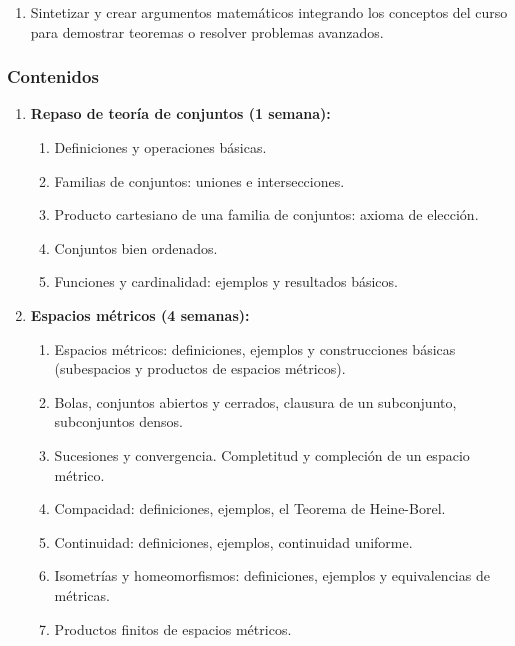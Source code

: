 \begin{refsection}
\begin{enumerate}
\item Sintetizar y crear argumentos matemáticos integrando los conceptos del curso para demostrar teoremas o resolver problemas avanzados.

\end{enumerate}

\subsubsection*{Contenidos}



\begin{enumerate}

\item \textbf{Repaso de teoría de conjuntos (1 semana):} 
\begin{enumerate}
    \item Definiciones y operaciones básicas.
    \item Familias de conjuntos: uniones e intersecciones.
    \item Producto cartesiano de una familia de conjuntos: axioma de elección.
    \item Conjuntos bien ordenados.
    \item Funciones y cardinalidad: ejemplos y resultados básicos.
\end{enumerate}

\item \textbf{Espacios métricos (4 semanas):} 
\begin{enumerate}
    \item Espacios métricos: definiciones, ejemplos y construcciones básicas (subespacios y productos de espacios métricos).
    \item Bolas, conjuntos abiertos y cerrados, clausura de un subconjunto, subconjuntos densos.
    \item Sucesiones y convergencia. Completitud y compleción de un espacio métrico. 
    \item Compacidad: definiciones, ejemplos, el Teorema de Heine-Borel.
    \item Continuidad: definiciones, ejemplos, continuidad uniforme.
    \item Isometrías y homeomorfismos: definiciones, ejemplos y equivalencias de métricas.
    \item Productos finitos de espacios métricos.
\end{enumerate}


\end{enumerate}
\end{refsection}
